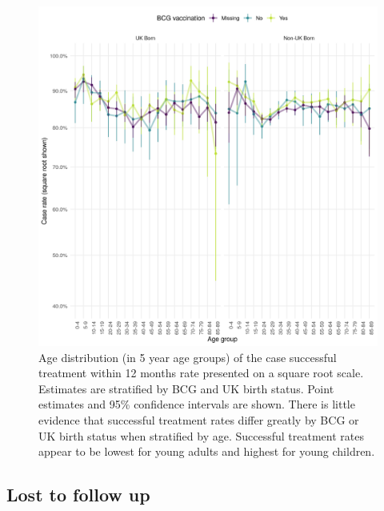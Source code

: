 \documentclass[11pt,twoside]{bristolthesis}
\begin{document}
  \begin{figure}
  
  {\centering \includegraphics[width=0.8\linewidth,]{chapters/tb-epi-england/figures/plot-suc-treat-age-dist} 
  
  }
  
  \caption[Age distribution (in 5 year age groups) of the case successful treatment within 12 months rate presented on a square root scale.]{Age distribution (in 5 year age groups) of the case successful treatment within 12 months rate presented on a square root scale. Estimates are stratified by BCG and UK birth status. Point estimates and 95\%  confidence intervals are shown. There is little evidence that successful treatment rates differ greatly by BCG or UK birth status when stratified by age. Successful treatment rates appear to be lowest for young adults and highest for young children.}\label{fig:plot-succ-treat-age-dist}
  \end{figure}
  \hypertarget{lost-to-follow-up}{%
  \subsection{Lost to follow up}\label{lost-to-follow-up}}
  
\end{document}
